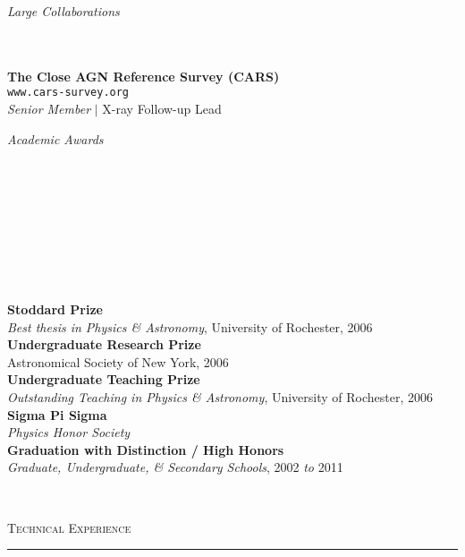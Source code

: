 \documentclass[11pt]{article}
\makeatletter
\def\vhrulefill#1{\leavevmode\leaders\hrule\@height#1\hfill \kern\z@}
\makeatother
\begin{document}
\vspace{6mm}

\hspace{2.5mm} \parbox{1.5in}{\textit{Large Collaborations \\\\\\}} \parbox{5.15in}{\textbf{The Close AGN Reference Survey (CARS)} \\ \texttt{www.cars-survey.org} \\ \textit{Senior Member} $|$ X-ray Follow-up Lead \\
}

\hspace{2.5mm} \parbox{1.5in}{\textit{Academic Awards \\\\\\\\\\\\\\\\\\}} \parbox{5.15in}{
\textbf{Stoddard Prize} \\ \textit{Best thesis in Physics \& Astronomy}, University of Rochester, 2006 \\
\textbf{Undergraduate Research Prize} \\ Astronomical Society of New York, 2006 \\
\textbf{Undergraduate Teaching Prize} \\ \textit{Outstanding Teaching in Physics \& Astronomy}, University of Rochester, 2006\\
\textbf{Sigma Pi Sigma} \\ \textit{Physics Honor Society} \\
\textbf{Graduation with Distinction / High Honors} \\ \textit{Graduate, Undergraduate, \& Secondary Schools}, 2002 \textit{to} 2011
} \\


\vspace{2mm}



\textsc{Technical Experience} \vhrulefill{0.4pt}

\vspace{5mm}
\end{document}
